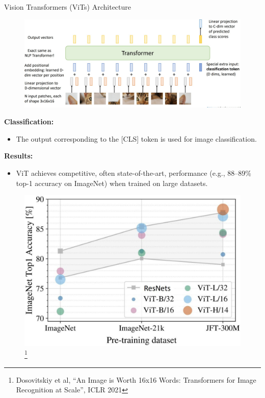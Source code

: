 \begin{frame}[allowframebreaks]{Vision Transformers (ViTs) Architecture}
    \framebreak

    \begin{figure}
        \flushleft
        \includegraphics[width=\linewidth,height=\textheight,keepaspectratio]{images/vit/slide_63_1_img.jpg}
    \end{figure}

    \framebreak

    \textbf{Classification:}
    \begin{itemize}
        \item The output corresponding to the [CLS] token is used for image classification.
    \end{itemize}
    \vspace{1em}

    \textbf{Results:}
    \begin{itemize}
        \item ViT achieves competitive, often state-of-the-art, performance (e.g., 88--89\% top-1 accuracy on ImageNet) when trained on large datasets.
    \end{itemize}

    \framebreak

    \begin{figure}
        \flushleft
        \includegraphics[width=\linewidth,height=0.8\textheight,keepaspectratio]{images/vit/slide_64_1_img.png}
        \footnote{Dosovitskiy et al, “An Image is Worth 16x16 Words: Transformers for Image Recognition at Scale”, ICLR 2021}
    \end{figure}
\end{frame}
